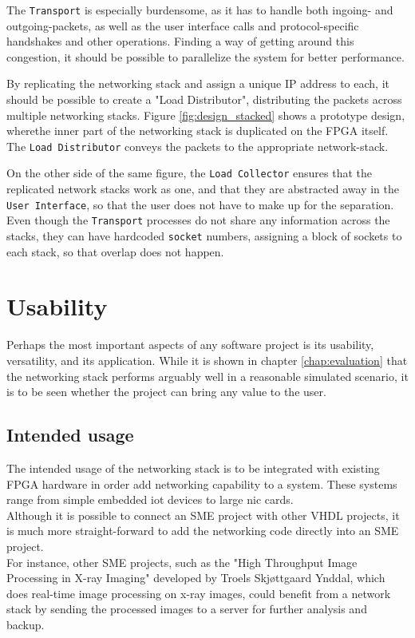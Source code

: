The \texttt{Transport} is especially burdensome, as it has to handle both
ingoing- and outgoing-packets, as well as the user interface calls and
protocol-specific handshakes and other operations. Finding a way of getting
around this congestion, it should be possible to parallelize the system for
better performance.

By replicating the networking stack and assign a unique IP address to each, it
should be possible to create a "Load Distributor", distributing the packets
across multiple networking stacks. Figure \ref{fig:design_stacked} shows a
prototype design, wherethe inner part of the networking stack is duplicated on
the FPGA itself. The \texttt{Load Distributor} conveys the packets to the
appropriate network-stack.

On the other side of the same figure, the \texttt{Load Collector} ensures that
the replicated network stacks work as one, and that they are abstracted away
in the \texttt{User Interface}, so that the user does not have to make up for
the separation. Even though the \texttt{Transport} processes do not share any
information across the stacks, they can have hardcoded \texttt{socket} numbers,
assigning a block of sockets to each stack, so that overlap does not happen.


\section{Usability}
Perhaps the most important aspects of any software project is its usability,
versatility, and its application.
While it is shown in chapter \ref{chap:evaluation} that the networking stack
performs arguably well in a reasonable simulated scenario, it is to be seen
whether the project can bring any value to the user.

\subsection{Intended usage}
The intended usage of the networking stack is to be integrated with existing
FPGA hardware in order add networking capability to a system. These systems
range from simple embedded \gls{iot} devices to large \gls{nic} cards.\\
Although it is possible to connect an SME project with other VHDL projects, it
is much more straight-forward to add the networking code directly into an SME
project.\\
For instance, other SME projects, such as the "High Throughput Image Processing in X-ray
Imaging" developed by Troels Skjøttgaard Ynddal\cite{troels}, which does
real-time image processing on x-ray images, could benefit from a network stack
by sending the processed images to a server for further analysis and backup.

